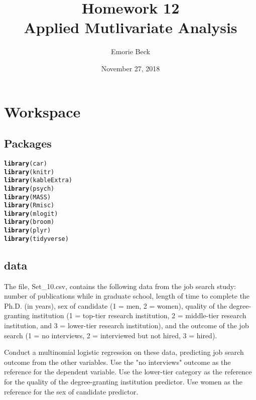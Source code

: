 \documentclass{article}\usepackage[]{graphicx}\usepackage[]{color}
\title{%
Homework 12\\
\large Applied Mutlivariate Analysis}
\date{November 27, 2018}
\author{Emorie Beck}
\makeatletter
\newcommand{\hlstd}[1]{\textcolor[rgb]{0.345,0.345,0.345}{#1}}%
\newcommand{\hlkwd}[1]{\textcolor[rgb]{0.737,0.353,0.396}{\textbf{#1}}}%
\newenvironment{kframe}{%
 \def\at@end@of@kframe{}%
 \ifinner\ifhmode%
  \def\at@end@of@kframe{\end{minipage}}%
  \begin{minipage}{\columnwidth}%
 \fi\fi%
 \def\FrameCommand##1{\hskip\@totalleftmargin \hskip-\fboxsep
 \colorbox{shadecolor}{##1}\hskip-\fboxsep
     \hskip-\linewidth \hskip-\@totalleftmargin \hskip\columnwidth}%
 \MakeFramed {\advance\hsize-\width
   \@totalleftmargin\z@ \linewidth\hsize
   \@setminipage}}%
 {\par\unskip\endMakeFramed%
 \at@end@of@kframe}
\newenvironment{knitrout}{}{} %
\makeatother
\begin{document}
\maketitle

\section{Workspace}
\subsection{Packages}



\begin{knitrout}
\color{fgcolor}\begin{kframe}
\begin{alltt}
\hlkwd{library}\hlstd{(car)}
\hlkwd{library}\hlstd{(knitr)}
\hlkwd{library}\hlstd{(kableExtra)}
\hlkwd{library}\hlstd{(psych)}
\hlkwd{library}\hlstd{(MASS)}
\hlkwd{library}\hlstd{(Rmisc)}
\hlkwd{library}\hlstd{(mlogit)}
\hlkwd{library}\hlstd{(broom)}
\hlkwd{library}\hlstd{(plyr)}
\hlkwd{library}\hlstd{(tidyverse)}
\end{alltt}
\end{kframe}
\end{knitrout}



\subsection{data}
The file, Set\_10.csv, contains the following data from the job search study: number of publications while in graduate school, length of time to complete the Ph.D. (in years), sex of candidate (1 = men, 2 = women), quality of the degree-granting institution (1 = top-tier research institution, 2 = middle-tier research institution, and 3 = lower-tier research institution), and the outcome of the job search (1 = no interviews, 2 = interviewed but not hired, 3 = hired).

Conduct a multinomial logistic regression on these data, predicting job search outcome from the other variables. Use the "no interviews" outcome as the reference for the dependent variable. Use the lower-tier category as the reference for the quality of the degree-granting institution predictor. Use women as the reference for the sex of candidate predictor.
\end{document}
